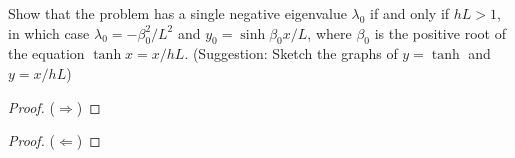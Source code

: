 Show that the problem has a single negative eigenvalue $\lambda_0$ if and only if $hL > 1$, in which case $\lambda_0 = - \beta_0^2 /L^2$ and $y_0 = \sinh \beta_0 x/L$, where $\beta_0$ is the positive root of the equation $\tanh x = x/hL$. (Suggestion: Sketch the graphs of $y = \tanh$ and $y = x/hL$)


\begin{proof} ($\Longrightarrow$) 
    
    \nl  \vspace{3.5in}
\end{proof}


\begin{proof}($\Longleftarrow$) 
    
    \nl \vspace{3.5in}
\end{proof}